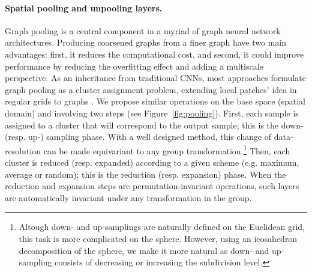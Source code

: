 \documentclass{article}
\begin{document}
\paragraph{Spatial pooling and unpooling layers.} Graph pooling is a central component in a myriad of graph neural network architectures. Producing coarsened graphs from a finer graph have two main advantages: first, it reduces the computational cost, and second, it could improve performance by reducing the overfitting effect and adding a multiscale perspective. As an inheritance from traditional CNNs, most approaches formulate graph pooling as a cluster assignment problem, extending local patches' idea in regular grids to graphs \citep{dhillon2007weighted, ying2018hierarchical, khasahmadi2020memory, mesquita2020rethinking}. We propose similar operations on the base space (spatial domain) and involving two steps (see Figure~\ref{fig:pooling}). First, each sample is assigned to a cluster that will correspond to the output sample; this is the down- (resp. up-) sampling phase. With a well designed method, this change of data-resolution can be made equivariant to any group transformation.\footnote{Altough down- and up-samplings are naturally defined on the Euclidean grid, this task is more complicated on the sphere. However, using an icosahedron decomposition of the sphere, we make it more natural as down- and up-sampling consists of decreasing or increasing the subdivision level.} Then, each cluster is reduced (resp. expanded) according to a given scheme (e.g. maximum, average or random); this is the reduction (resp. expansion) phase. When the reduction and expansion steps are permutation-invariant operations, such layers are automatically invariant under any transformation in the group. 
\end{document}
